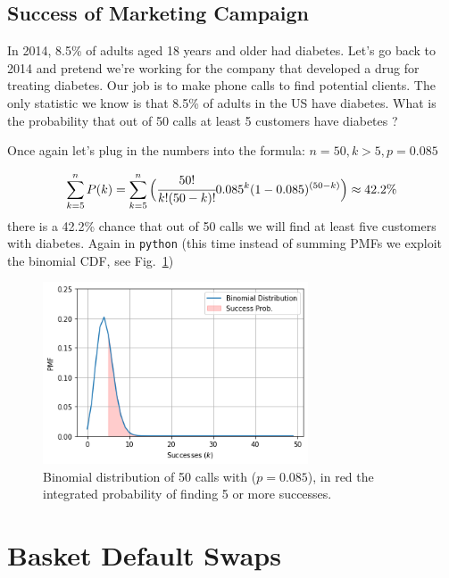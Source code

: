 \subsection{Success of Marketing Campaign}
\label{success-of-marketing-campaign}

In 2014, 8.5\% of adults aged 18 years and older had diabetes. Let's go back to 2014 and pretend we're working for the company that developed a drug for treating diabetes. Our job is to make phone calls to find potential clients. The only statistic we know is that 8.5\% of adults in the US have diabetes. What is the probability that out of 50 calls at least 5 customers have diabetes ? 

Once again let's plug in the numbers into the formula: $n = 50, k > 5, p = 0.085$

\begin{equation*}
\sum_{k=5}^{n}P(k) = \sum_{k=5}^{n}\Big(\cfrac{50!}{k!(50 - k)!}0.085^{k}(1-0.085)^{(50-k)}\Big) \approx 42.2\%
\end{equation*}
there is a 42.2\% chance that out of 50 calls we will find at least five customers with diabetes. Again in \texttt{python} (this time instead of summing PMFs we exploit the binomial CDF, see Fig.~\ref{fig:binomial_cdf})


\begin{figure}[htb]
\centering
\includegraphics[width=0.7\textwidth]{figures/binomial_5_0.png}
\caption{Binomial distribution of 50 calls with ($p=0.085$), in red the integrated probability of finding 5 or more successes.}
\label{fig:binomial_cdf}
\end{figure}

\section{Basket Default Swaps}
\label{basket-default-swaps}

